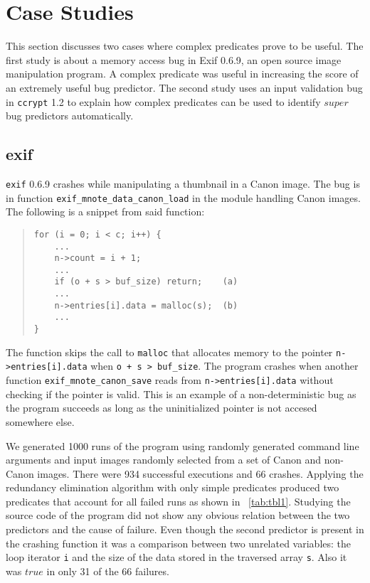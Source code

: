\section{Case Studies}
\label{sec-qual}
This section discusses two cases where complex predicates prove to be useful.  The first study is about a memory access bug in Exif 0.6.9, an open source image manipulation program.  A complex predicate was useful in increasing the score of an extremely useful bug predictor.  The second study uses an input validation bug in \texttt{ccrypt} 1.2 to explain how complex predicates can be used to identify $super$ bug predictors automatically.

\subsection{exif}
\texttt{exif} 0.6.9 crashes while manipulating a thumbnail in a Canon image.  The bug is in function \texttt{exif\_mnote\_data\_canon\_load} in the module handling Canon images.  The following is a snippet from said function:
\begin{quote}
\begin{verbatim}
for (i = 0; i < c; i++) {
    ...
    n->count = i + 1;
    ...
    if (o + s > buf_size) return;    (a)
    ...
    n->entries[i].data = malloc(s);  (b)
    ...
}
\end{verbatim}
\end{quote}

The function skips the call to \texttt{malloc} that allocates memory to the pointer \texttt{n->entries[i].data} when \texttt{o + s > buf\_size}.  The program crashes when another function \texttt{exif\_\-mnote\_\-canon\_save} reads from \texttt{n->entries[i].data} without checking if the pointer is valid.  This is an example of a non-deterministic bug as the program succeeds as long as the uninitialized pointer is not accesed somewhere else.

We generated 1000 runs of the program using randomly generated command line arguments and input images randomly selected from a set of Canon and non-Canon images.  There were 934 successful executions and 66 crashes.  Applying the redundancy elimination algorithm with only simple predicates produced two predicates that account for all failed runs as shown in ~\autoref{tab:tbl1}.  Studying the source code of the program did not show any obvious relation between the two predictors and the cause of failure.  Even though the second predictor is present in the crashing function it was a comparison between two unrelated variables: the loop iterator \texttt{i} and the size of the data stored in the traversed array \texttt{s}.  Also it was $true$ in only 31 of the 66 failures.

